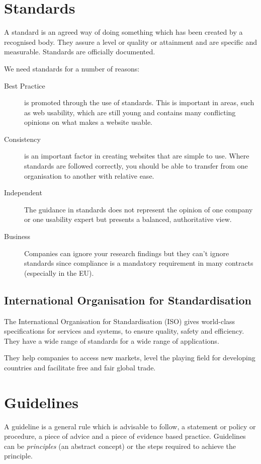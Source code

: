 
\section{Standards}
A standard is an agreed way of doing something which has been created by a recognised body. They assure a level or quality or attainment and are specific and measurable. Standards are officially documented. 

We need standards for a number of reasons:
\begin{description}
    \item[Best Practice] is promoted through the use of standards. This is important in areas, such as web usability, which are still young  and contains many conflicting opinions on what makes a website usable.
    \item[Consistency] is an important factor in creating websites that are simple to use. Where standards are followed correctly, you should be able to transfer from one organisation to another with relative ease.
    \item[Independent] The guidance in standards does not represent the opinion of one company or one usability expert but presents a balanced, authoritative view. 
    \item[Business] Companies can ignore your research findings but they can't ignore standards since compliance is a mandatory requirement in many contracts (especially in the EU).
\end{description}

\subsection{International Organisation for Standardisation}
The International Organisation for Standardisation (ISO) gives world-class specifications for services and systems, to ensure quality, safety and efficiency. They have a wide range of standards for a wide range of applications.

They help companies to access new markets, level the playing field for developing countries and facilitate free and fair global trade. 

\section{Guidelines}
A guideline is a general rule which is advisable to follow, a statement or policy or procedure, a piece of advice and a piece of evidence based practice. Guidelines can be \textit{principles} (an abstract concept) or the steps required to achieve the principle.

